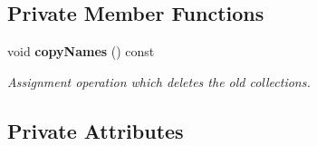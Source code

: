 \subsection*{Private Member Functions}
\begin{DoxyCompactItemize}
\item 
void {\bf copyNames} () const 
\begin{DoxyCompactList}\small\item\em Assignment operation which deletes the old collections. \item\end{DoxyCompactList}\end{DoxyCompactItemize}
\subsection*{Private Attributes}
